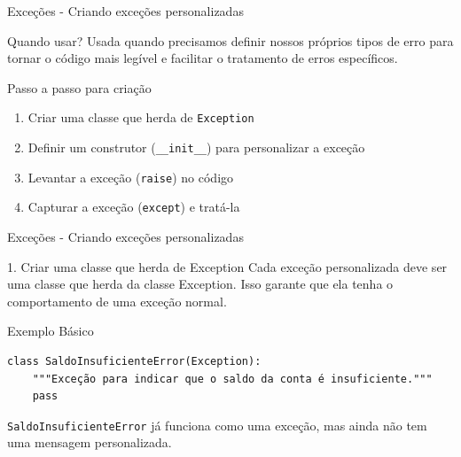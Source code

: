 \begin{frame}[fragile]{Exceções - Criando exceções personalizadas}

    \begin{block}{Quando usar?}
        Usada quando precisamos definir nossos próprios tipos de erro para tornar o código mais legível e facilitar o tratamento de erros específicos.
    \end{block}

    \begin{block}{Passo a passo para criação}
        \begin{enumerate}
            \item Criar uma classe que herda de \texttt{Exception}
            \item Definir um construtor (\texttt{\_\_init\_\_}) para personalizar a exceção
            \item Levantar a exceção (\texttt{raise}) no código
            \item Capturar a exceção (\texttt{except}) e tratá-la
        \end{enumerate}
    \end{block}


\end{frame}


\begin{frame}[fragile]{Exceções - Criando exceções personalizadas}

    \begin{block}{1. Criar uma classe que herda de Exception}
        Cada exceção personalizada deve ser uma classe que herda da classe Exception. Isso garante que ela tenha o comportamento de uma exceção normal.
    \end{block}

    \begin{exampleblock}{Exemplo Básico}
        \begin{verbatim}
class SaldoInsuficienteError(Exception):
    """Exceção para indicar que o saldo da conta é insuficiente."""
    pass
\end{verbatim}
    \end{exampleblock}

    \begin{block}{}
        \small
        \texttt{SaldoInsuficienteError} já funciona como uma exceção, mas ainda não tem uma mensagem personalizada.
    \end{block}


\end{frame}

